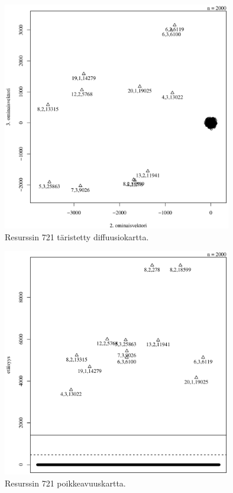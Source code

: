 \begin{figure}[p]
\centering
\includegraphics[width=10cm]{pics/diffuusiokuvat/service_721.pdf}
\caption{Resurssin 721 täristetty diffuusiokartta.}
\label{diffuusio_721}
\end{figure}

\begin{figure}[p]
\centering
\includegraphics[width=10cm]{pics/tiheyskuvat/service_721.pdf}
\caption{Resurssin 721 poikkeavuuskartta.}
\label{service_721}
\end{figure}

